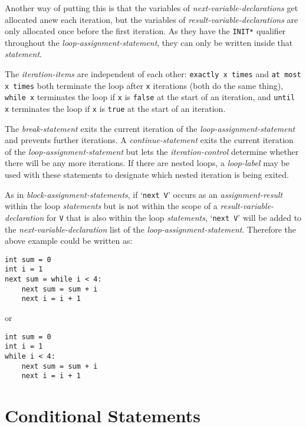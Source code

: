 \documentclass[12pt]{article}
\newenvironment{indpar}[1][0.3in]%
	{\begin{list}{}%
		     {\setlength{\itemsep}{0in}%
		      \setlength{\topsep}{0in}%
		      \setlength{\parsep}{1ex}%
		      \setlength{\labelwidth}{#1}%
		      \setlength{\leftmargin}{#1}%
		      \addtolength{\leftmargin}{\labelsep}}%
	 \item}%
	{\end{list}}
\begin{document}
Another way of putting this is that the variables of
{\em next-variable-declarations} get allocated anew each
iteration, but the variables of {\em result-variable-declarations}
are only allocated once before the first iteration.  As they
have the {\tt *INIT*} qualifier throughout the
{\em loop-assignment-statement}, they can only be written
inside that {\em statement}.

The {\em iteration-items} are independent of each other:
{\tt exactly x times} and {\tt at most x times} both terminate
the loop after {\tt x} iterations (both do the same thing),
{\tt while x} terminates
the loop if {\tt x} is {\tt false} at the start of an iteration,
and {\tt until x} terminates
the loop if {\tt x} is {\tt true} at the start of an iteration.

The {\em break-statement} exits the current iteration of the
{\em loop-assignment-statement} and prevents further iterations.
A {\em continue-statement} exits the current iteration of the
{\em loop-assignment-statement} but lets the
{\em iteration-control} determine whether there will be any
more iterations.  If there are nested loops, a {\em loop-label}
may be used with these statements to designate which nested iteration
is being exited.

\label{LOOP-NEXT-PROMOTION}
As in {\em block-assignment-statements}, if `{\tt next V}' occurs
as an {\em assignment-result} within the loop {\em statements}
but is not within the scope of a {\em result-variable-declaration}
for {\tt V} that is also within the loop {\em statements},
`{\tt next V}' will be added to the {\em next-variable-declaration}
list of the {\em loop-assignment-statement}.  Therefore the
above example could be written as:
\begin{indpar}\begin{verbatim}
int sum = 0
int i = 1
next sum = while i < 4:
    next sum = sum + i
    next i = i + 1
\end{verbatim}\end{indpar}
or
\begin{indpar}\begin{verbatim}
int sum = 0
int i = 1
while i < 4:
    next sum = sum + i
    next i = i + 1
\end{verbatim}\end{indpar}

\section{Conditional Statements}
\label{CONDITIONAL-STATEMENTS}
\end{document}
